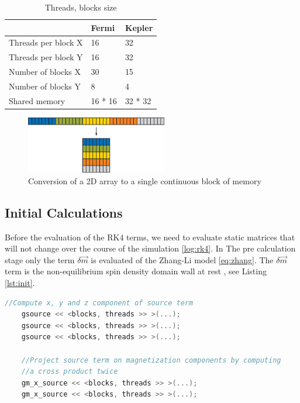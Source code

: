 \begin{table}[h]
\centering
\begin{tabular}{| l | l | l |}
\hline
 & Fermi & Kepler \\
\hline
Threads per block X  & 16 & 32 \\
\hline
Threads per block Y  & 16 & 32 \\
\hline
Number of blocks X & 30 & 15 \\
\hline
Number of blocks Y & 8 & 4 \\
\hline
Shared memory & 16 * 16 & 32 * 32 \\
\hline
\end{tabular}
\caption{Threads, blocks size}
\label{tab:threads}
\end{table}


\begin{figure}[htbp]
	\centering
		\includegraphics[width=0.55\textwidth]{Figures/flaten.png}
		\smallskip
	\caption[2D Flatten array]{Conversion of a 2D array to a single continuous block of memory}
	\label{fig:flaten}
\end{figure}


\subsection{Initial Calculations}

Before the evaluation of the RK4 terms, we need to evaluate static matrices that will not change over the course of the simulation \ref{log:rk4}. In The pre calculation stage only the term $ \delta \vec{m}$ is evaluated of the Zhang-Li model \ref{eq:zhang}. The $ \delta \vec{m}$ term is the non-equilibrium spin density domain wall at rest \cite{claudio}, see Listing \ref{lst:init}.

\begin{lstlisting}[language=C++, label={lst:init}, caption={Initial calculations}]
	//Compute x, y and z component of source term
    gsource << <blocks, threads >> >(...);
    gsource << <blocks, threads >> >(...);
    gsource << <blocks, threads >> >(...);

    //Project source term on magnetization components by computing
    //a cross product twice
    gm_x_source << <blocks, threads >> >(...);
    gm_x_source << <blocks, threads >> >(...);
\end{lstlisting}

